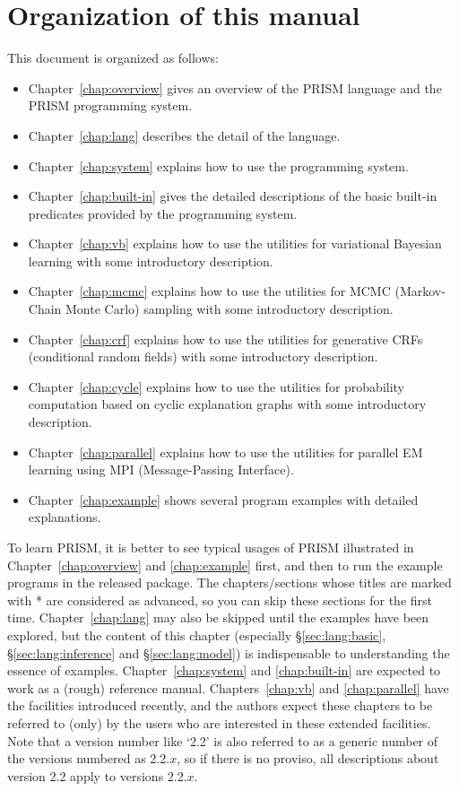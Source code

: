 \documentclass[a4paper]{report}
\newcommand{\secref}[1]{\S\ref{#1}}
\begin{document}
\section*{Organization of this manual}
\label{sec:overview:organization}

This document is organized as follows:
\begin{itemize}
\item
  Chapter~\ref{chap:overview} gives an overview of the PRISM language
  and the PRISM programming system.
\item
  Chapter~\ref{chap:lang} describes the detail of the language.
\item
  Chapter~\ref{chap:system} explains how to use the programming system.
\item
  Chapter~\ref{chap:built-in} gives the detailed descriptions of
  the basic built-in predicates provided by the programming system.
\item
  Chapter~\ref{chap:vb} explains how to use the utilities for
  variational Bayesian learning with some introductory description.
\item
  Chapter~\ref{chap:mcmc} explains how to use the utilities for
  MCMC (Markov-Chain Monte Carlo) sampling
  with some introductory description.
\item
  Chapter~\ref{chap:crf} explains how to use the utilities for
  generative CRFs (conditional random fields)
  with some introductory description.
\item
  Chapter~\ref{chap:cycle} explains how to use the utilities for
  probability computation based on cyclic explanation graphs
  with some introductory description.
\item
  Chapter~\ref{chap:parallel} explains how to use the utilities for
  parallel EM learning using MPI (Message-Passing Interface).
\item
  Chapter~\ref{chap:example} shows several program examples with detailed
  explanations.
\end{itemize}
To learn PRISM, it is better to see typical usages of PRISM illustrated
in Chapter~\ref{chap:overview} and \ref{chap:example} first, and then to
run the example programs in the released package.    The chapters/sections
whose titles are marked with * are considered as advanced, so you can
skip these sections for the first time.  Chapter~\ref{chap:lang} may
also be skipped until the examples have been explored, but the content
of this chapter (especially \secref{sec:lang:basic},
\secref{sec:lang:inference} and \secref{sec:lang:model})
is indispensable to understanding the essence of examples.
Chapter~\ref{chap:system} and \ref{chap:built-in} are expected to work as
a (rough) reference manual.  Chapters~\ref{chap:vb} and \ref{chap:parallel}
have the facilities introduced recently, and the authors
expect these chapters to be referred to (only) by the users who are
interested in these extended facilities.  Note that a version number like
`2.2' is also referred to as a generic number of the versions numbered as
2.2.$x$, so if there is no proviso, all descriptions about version 2.2
apply to versions 2.2.$x$.
\end{document}
